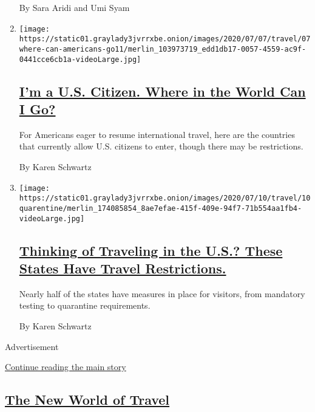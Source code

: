 \begin{enumerate}
  By Sara Aridi and Umi Syam
\item
  \texttt{[image: https://static01.graylady3jvrrxbe.onion/images/2020/07/07/travel/07where-can-americans-go11/merlin\_103973719\_edd1db17-0057-4559-ac9f-0441cce6cb1a-videoLarge.jpg]}

  \hypertarget{im-a-us-citizen-where-in-the-world-can-i-go}{%
  \subsection{\texorpdfstring{\href{/2020/07/07/travel/american-travelers-restrictions-coronavirus.html}{I'm
  a U.S. Citizen. Where in the World Can I
  Go?}}{I'm a U.S. Citizen. Where in the World Can I Go?}}\label{im-a-us-citizen-where-in-the-world-can-i-go}}

  For Americans eager to resume international travel, here are the
  countries that currently allow U.S. citizens to enter, though there
  may be restrictions.

  By Karen Schwartz
\item
  \texttt{[image: https://static01.graylady3jvrrxbe.onion/images/2020/07/10/travel/10quarentine/merlin\_174085854\_8ae7efae-415f-409e-94f7-71b554aa1fb4-videoLarge.jpg]}

  \hypertarget{thinking-of-traveling-in-the-us-these-states-have-travel-restrictions}{%
  \subsection{\texorpdfstring{\href{/2020/07/10/travel/state-travel-restrictions.html}{Thinking
  of Traveling in the U.S.? These States Have Travel
  Restrictions.}}{Thinking of Traveling in the U.S.? These States Have Travel Restrictions.}}\label{thinking-of-traveling-in-the-us-these-states-have-travel-restrictions}}

  Nearly half of the states have measures in place for visitors, from
  mandatory testing to quarantine requirements.

  By Karen Schwartz
\end{enumerate}

Advertisement

\protect\hyperlink{after-mid1}{Continue reading the main story}

\hypertarget{the-new-world-of-travel}{%
\subsection{\texorpdfstring{\href{/spotlight/the-new-world-of-travel}{The
New World of
Travel}}{The New World of Travel}}\label{the-new-world-of-travel}}

